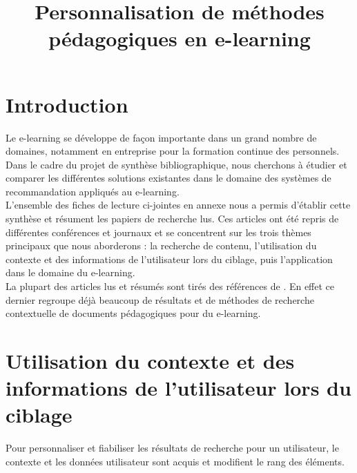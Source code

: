 \documentclass[conference]{./sty/IEEEtran}
\begin{document}
\title{Personnalisation de méthodes pédagogiques en e-learning}


\author{
}

\maketitle
\newpage

\tableofcontents
\newpage

\section{Introduction}

Le e-learning se développe de façon importante dans un grand nombre de
domaines, notamment en entreprise pour la formation continue des personnels.
Dans le cadre du projet de synthèse bibliographique, nous cherchons à étudier
et comparer les différentes solutions existantes dans le domaine des systèmes
de recommandation appliqués au e-learning. \\

L'ensemble des fiches de lecture ci-jointes en annexe nous a permis d'établir
cette synthèse et résument les papiers de recherche lus. Ces articles ont été
repris de différentes conférences et journaux et se concentrent sur les trois
thèmes principaux que nous aborderons : la recherche de contenu, l'utilisation
du contexte et des informations de l'utilisateur lors du ciblage, puis
l'application dans le domaine du e-learning. \\

La plupart des articles lus et résumés sont tirés des références de
\cite{DBLP:journals/tlt/VerbertMOWDBD12}. En effet ce dernier regroupe déjà
beaucoup de résultats et de méthodes de recherche contextuelle de documents
pédagogiques pour du e-learning. \\



\section{Utilisation du contexte et des informations de l'utilisateur lors du ciblage}

Pour personnaliser et fiabiliser les résultats de recherche pour un
utilisateur, le contexte et les données utilisateur sont acquis et modifient le
rang des éléments. \\
\end{document}
